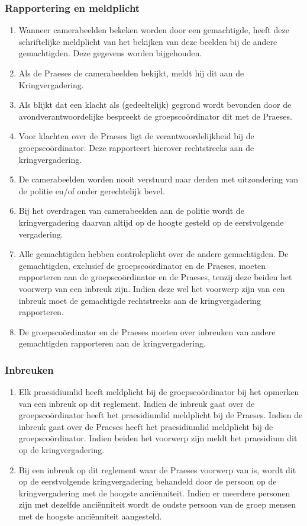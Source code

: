     \subsubsection{Rapportering en meldplicht}
    \begin{enumerate}
        \item Wanneer camerabeelden bekeken worden door een gemachtigde, heeft deze schriftelijke meldplicht van het bekijken van deze beelden bij de andere gemachtigden. Deze gegevens worden bijgehouden.
        \item Als de Praeses de camerabeelden bekijkt, meldt hij dit aan de Kringvergadering.
        \item Als blijkt dat een klacht als (gedeeltelijk) gegrond wordt bevonden door de avondverantwoordelijke bespreekt de groepsco\"ordinator dit met de Praeses. 
        \item Voor klachten over de Praeses ligt de verantwoordelijkheid bij de groepscoördinator. Deze rapporteert hierover rechtstreeks aan de kringvergadering.
        \item De camerabeelden worden nooit verstuurd naar derden met uitzondering van de politie en/of onder gerechtelijk bevel.
        \item Bij het overdragen van camerabeelden aan de politie wordt de kringvergadering daarvan altijd op de hoogte gesteld op de eerstvolgende vergadering.
        \item Alle gemachtigden hebben controleplicht over de andere gemachtigden. De gemachtigden, exclusief de groepscoördinator en de Praeses, moeten rapporteren aan de groepscoördinator en de Praeses, tenzij deze beiden het voorwerp van een inbreuk zijn. Indien deze wel het voorwerp zijn van een inbreuk moet de gemachtigde rechtstreeks aan de kringvergadering rapporteren. 
        \item De groepsco\"ordinator en de Praeses moeten over inbreuken van andere gemachtigden rapporteren aan de kringvergadering.
    \end{enumerate}
    
    \subsubsection{Inbreuken}
    \begin{enumerate}
        \item Elk praesidiumlid heeft meldplicht bij de groepscoördinator bij het opmerken van een inbreuk op dit reglement. Indien de inbreuk gaat over de groepscoördinator heeft het praesidiumlid meldplicht bij de Praeses. Indien de inbreuk gaat over de Praeses heeft het praesidiumlid meldplicht bij de groepscoördinator. Indien beiden het voorwerp zijn meldt het praesidium dit op de kringvergadering.
        \item Bij een inbreuk op dit reglement waar de Praeses voorwerp van is, wordt dit op de eerstvolgende kringvergadering behandeld door de persoon op de kringvergadering met de hoogste anciënniteit. Indien er meerdere personen zijn met dezelfde anciënniteit wordt de oudste persoon van de groep mensen met de hoogste anciënniteit aangesteld.  
    \end{enumerate}

